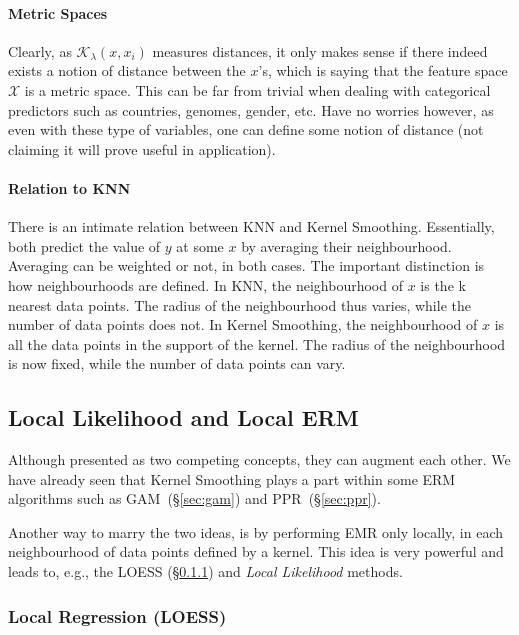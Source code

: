\documentclass[12pt,a4paper]{article}
\theoremstyle{plain}
\theoremstyle{definition}
\newcommand{\kernel}{\mathcal{K}}
\newcommand{\featureS}{\mathcal{X}}
\begin{document}
\paragraph{Metric Spaces}
Clearly, as $\kernel_\lambda(x,x_i)$ measures distances, it only makes sense if there indeed exists a notion of distance between the $x$'s, which is saying that the feature space $\featureS$ is a metric space. 
This can be far from trivial when dealing with categorical predictors such as countries, genomes, gender, etc.
Have no worries however, as even with these type of variables, one can define some notion of distance (not claiming it will prove useful in application).


\paragraph{Relation to KNN}
There is an intimate relation between KNN and Kernel Smoothing. 
Essentially, both predict the value of $y$ at some $x$ by averaging their neighbourhood. 
Averaging can be weighted or not, in both cases.
The important distinction is how neighbourhoods are defined.
In KNN, the neighbourhood of $x$ is the k nearest data points. The radius of the neighbourhood thus varies, while the number of data points does not.
In Kernel Smoothing, the neighbourhood of $x$ is all the data points in the support of the kernel. The radius of the neighbourhood is now fixed, while the number of data points can vary.




\subsection{Local Likelihood and Local ERM}
Although presented as two competing concepts, they can augment each other. 
We have already seen that Kernel Smoothing plays a part within some ERM algorithms such as GAM~(\S\ref{sec:gam}) and PPR~(\S \ref{sec:ppr}).

Another way to marry the two ideas, is by performing EMR only locally, in each neighbourhood of data points defined by a kernel. This idea is very powerful and leads to, e.g., the LOESS (\S \ref{sec:loess}) and \emph{Local Likelihood} methods.



\subsubsection{Local Regression (LOESS)}
\label{sec:loess}
\end{document}
